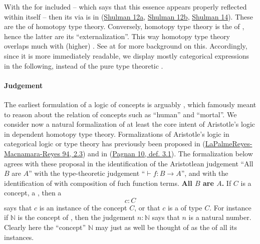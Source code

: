 \documentclass[12pt,titlepage]{article}
\theoremstyle{plain}
\theoremstyle{definition}
\theoremstyle{remark}
\begin{document}
With the  for   included -- which says that this essence appears properly reflected within itself -- then its  via  is in   (\hyperlink{Shulman12a}{Shulman 12a}, \hyperlink{Shulman12b}{Shulman 12b}, \hyperlink{Shulman14}{Shulman 14}). These are the  of homotopy type theory. Conversely, homotopy type theory is the  of , hence the latter are its ``externalization''. This way homotopy type theory overlaps much with (higher) . See at  for more background on this.
Accordingly, since it is more immediately readable, we display mostly categorical expressions in the following, instead of the pure type theoretic .
\hypertarget{JudgementInFormalization}{}\paragraph*{{Judgement}}\label{JudgementInFormalization}
The earliest formulation of a logic of concepts is arguably , which famously meant to reason about the relation of concepts such as ``human'' and ``mortal''. We consider now a natural formalization of at least the core intent of Aristotle's logic in dependent homotopy type theory.
Formalizations of Aristotle's logic in categorical logic or type theory has previously been proposed in (\hyperlink{PalmeReyesMacnamaraReyes94}{LaPalmeReyes-Macnamara-Reyes 94, 2.3}) and in (\hyperlink{Pagnan10}{Pagnan 10, def. 3.1}). The formalization below agrees with these proposal in the identification of the Aristotlean judgement ``All $B$ are $A$'' with the type-theoretic judgement ``$\vdash f \colon B\to A$'', and with the identification of  with composition of fuch function terms.
\textbf{All $B$ are $A$.}
If $C$ is a concept, a , then a 
\begin{displaymath}
c \colon C
\end{displaymath}
says that $c$ is an instance of the concept $C$, or that $c$ is a  of type $C$.
For instance if $\mathbb{N}$ is the concept of , then the judgement $n \colon \mathbb{N}$ says that $n$ is a natural number. Clearly here the ``concept'' $\mathbb{N}$ may just as well be thought of as the  of all its instances.
\end{document}
